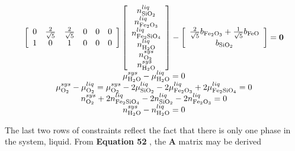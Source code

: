 \documentclass[11pt, titlepage, twoside]{article}
\begin{document}
\begin{MPEquation}[!ht]
\begin{equation}
\begin{array}{*{20}{c}}
{\left[ {\begin{array}{*{20}{c}}
0&{\frac{2}{{\sqrt 5 }}}&{\frac{2}{{\sqrt 5 }}}&0&0&0\\
1&0&1&0&0&0
\end{array}} \right]\left[ {\begin{array}{*{20}{c}}
{n_{{\rm{Si}}{{\rm{O}}_2}}^{liq}}\\
{n_{{\rm{F}}{{\rm{e}}_2}{{\rm{O}}_3}}^{liq}}\\
{n_{{\rm{F}}{{\rm{e}}_2}{\rm{Si}}{{\rm{O}}_4}}^{liq}}\\
{n_{{{\rm{H}}_2}{\rm{O}}}^{liq}}\\
{n_{{{\rm{O}}_2}}^{sys}}\\
{n_{{{\rm{H}}_2}{\rm{O}}}^{sys}}
\end{array}} \right] - \left[ {\begin{array}{*{20}{c}}
{\frac{2}{{\sqrt 5 }}{b_{{\rm{F}}{{\rm{e}}_{\rm{2}}}{{\rm{O}}_{\rm{3}}}}} + \frac{1}{{\sqrt 5 }}{b_{{\rm{FeO}}}}}\\
{{b_{{\rm{Si}}{{\rm{O}}_{\rm{2}}}}}}
\end{array}} \right] = {\bf{0}}}\\
{\mu _{{{\rm{H}}_2}{\rm{O}}}^{sys} - \mu _{{{\rm{H}}_2}{\rm{O}}}^{liq} = 0}\\
{\mu _{{{\rm{O}}_2}}^{sys} - \mu _{{{\rm{O}}_2}}^{liq} = \mu _{{{\rm{O}}_2}}^{sys} - 2\mu _{{\rm{Si}}{{\rm{O}}_2}}^{liq} - 2\mu _{{\rm{F}}{{\rm{e}}_{\rm{2}}}{{\rm{O}}_3}}^{liq} + 2\mu _{{\rm{F}}{{\rm{e}}_{\rm{2}}}{\rm{Si}}{{\rm{O}}_4}}^{liq} = 0}\\
n_{{{\rm{O}}_2}}^{sys} + 2n_{{\rm{F}}{{\rm{e}}_2}{\rm{Si}}{{\rm{O}}_4}}^{liq} - 2n_{{\rm{Si}}{{\rm{O}}_2}}^{liq} - 2n_{{\rm{F}}{{\rm{e}}_2}{{\rm{O}}_3}}^{liq} = 0\\
n_{{{\rm{H}}_2}{\rm{O}}}^{sys} - n_{{{\rm{H}}_2}{\rm{O}}}^{liq} = 0
\end{array}
\end{equation}
\label{MPEquationElement:E459E444-1CC9-4B02-AD4B-36C49DEF345C}
\end{MPEquation}
The last two rows of constraints reflect the fact that there is only one phase in the system, liquid. From \textbf{Equation 52} , the \textbf{A} matrix may be derived
\end{document}
